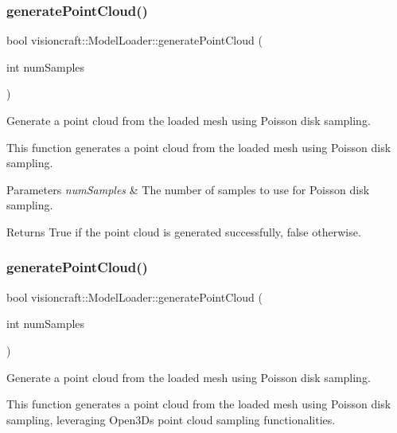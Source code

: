 \subsubsection{\texorpdfstring{generate\+Point\+Cloud()}{generatePointCloud()}\hspace{0.1cm}{\footnotesize\ttfamily [1/2]}}
{\footnotesize\ttfamily bool visioncraft\+::\+Model\+Loader\+::generate\+Point\+Cloud (\begin{DoxyParamCaption}\item[{int}]{num\+Samples }\end{DoxyParamCaption})}



Generate a point cloud from the loaded mesh using Poisson disk sampling. 

This function generates a point cloud from the loaded mesh using Poisson disk sampling.


\begin{DoxyParams}{Parameters}
{\em num\+Samples} & The number of samples to use for Poisson disk sampling. \\
\hline
\end{DoxyParams}
\begin{DoxyReturn}{Returns}
True if the point cloud is generated successfully, false otherwise. 
\end{DoxyReturn}
\mbox{\label{classvisioncraft_1_1ModelLoader_a9ab4c567f98c43ba6b5312525066cb24}} 
\subsubsection{\texorpdfstring{generate\+Point\+Cloud()}{generatePointCloud()}\hspace{0.1cm}{\footnotesize\ttfamily [2/2]}}
{\footnotesize\ttfamily bool visioncraft\+::\+Model\+Loader\+::generate\+Point\+Cloud (\begin{DoxyParamCaption}\item[{int}]{num\+Samples }\end{DoxyParamCaption})}



Generate a point cloud from the loaded mesh using Poisson disk sampling. 

This function generates a point cloud from the loaded mesh using Poisson disk sampling, leveraging Open3D\textquotesingle{}s point cloud sampling functionalities.


